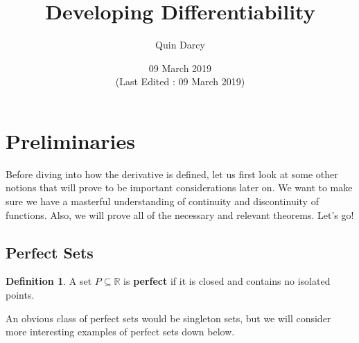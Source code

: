 \documentclass{article}
\theoremstyle{definition}
\newtheorem{definition}{Definition}[section]
\theoremstyle{remark}
\theoremstyle{definition}
\begin{document}
\title{Developing Differentiability}
\author{Quin Darcy}
\date{09 March 2019\\\small{(Last Edited : 09 March 2019)}}
\maketitle

\section{Preliminaries}

Before diving into how the derivative is defined, let us first look at some other notions that will prove to be important considerations later on. We want to make sure we have a masterful understanding of continuity and discontinuity of functions. Also, we will prove all of the necessary and relevant theorems. Let's go!

\subsection{Perfect Sets}

\begin{definition}
    A set $P\subseteq\mathbb{R}$ is \textbf{perfect} if it is closed and contains no isolated points. 
\end{definition}

An obvious class of perfect sets would be singleton sets, but we will consider more interesting examples of perfect sets down below.
\end{document}
